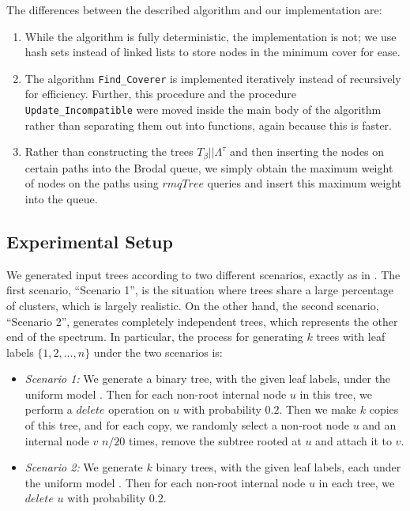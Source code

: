 \documentclass[final,1p,times]{elsarticle}
\newcommand{\leafset}{\Lambda}
\newcommand{\TB}{T_\beta}
\begin{document}
    The differences between the described algorithm and our implementation are:

    \begin{enumerate}
        \item While the algorithm is fully deterministic, the implementation is not; we use hash sets instead of linked lists to store nodes in the minimum cover for ease.

        \item The algorithm \texttt{Find\_Coverer} is implemented iteratively instead of recursively for efficiency. Further, this procedure and the procedure \texttt{Update\_Incompatible} were moved inside the main body of the algorithm rather than separating them out into functions, again because this is faster.

        \item Rather than constructing the trees $\TB||\leafset^{\tau}$ and then inserting the nodes on certain paths into the Brodal queue, we simply obtain the maximum weight of nodes on the paths using $rmqTree$ queries and insert this maximum weight into the queue.
    \end{enumerate}

    \subsection{Experimental Setup}
    \label{subsec:setup}

    We generated input trees according to two different scenarios, exactly as in \cite{jansson2018algorithms}. The first scenario, ``Scenario 1'', is the situation where trees share a large percentage of clusters, which is largely realistic. On the other hand, the second scenario, ``Scenario 2'', generates completely independent trees, which represents the other end of the spectrum. In particular, the process for generating $k$ trees with leaf labels $\{1, 2, \dots, n\}$ under the two scenarios is:

    \begin{itemize}
        \item \textit{Scenario 1:} We generate a binary tree, with the given leaf labels, under the uniform model \cite{mckenzie2000distributions}. Then for each non-root internal node $u$ in this tree, we perform a $delete$ operation on $u$ with probability $0.2$. Then we make $k$ copies of this tree, and for each copy, we randomly select a non-root node $u$ and an internal node $v$ $n / 20$ times, remove the subtree rooted at $u$ and attach it to $v$.

        \item \textit {Scenario 2:} We generate $k$ binary trees, with the given leaf labels, each under the uniform model \cite{mckenzie2000distributions}. Then for each non-root internal node $u$ in each tree, we $delete$ $u$ with probability $0.2$.
    \end{itemize}
\end{document}
